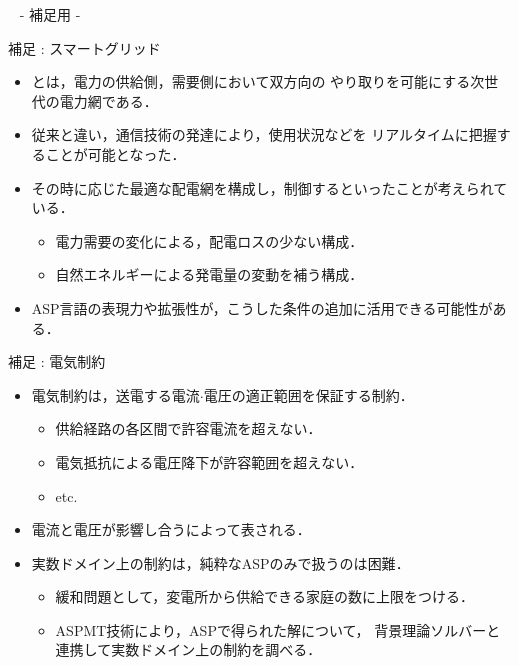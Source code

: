 \appendix
\backupbegin

\begin{frame}{~}
 \centering
 - 補足用 -
\end{frame} 

\begin{frame}{補足 : スマートグリッド}
 \begin{itemize}
  \item {}とは，電力の供給側，需要側において双方向の
		やり取りを可能にする次世代の電力網である．
  \item 従来と違い，通信技術の発達により，使用状況などを
		リアルタイムに把握することが可能となった．
  \item その時に応じた最適な配電網を構成し，制御するといったことが考えられている．
		\begin{itemize}
		 \item 電力需要の変化による，配電ロスの少ない構成．
		 \item 自然エネルギーによる発電量の変動を補う構成．
		\end{itemize}
  \item ASP言語の表現力や拡張性が，こうした条件の追加に活用できる可能性がある．
 \end{itemize}
\end{frame}

\begin{frame}{補足 : 電気制約}
 \begin{itemize}
  \item \alert{電気制約}は，送電する電流$\cdot$電圧の適正範囲を保証する制約．
  \begin{itemize}
   \item 供給経路の各区間で許容電流を超えない．
   \item 電気抵抗による電圧降下が許容範囲を超えない．
   \item etc.
  \end{itemize}
  \item 電流と電圧が影響し合うによって表される．
  \item 実数ドメイン上の制約は，純粋なASPのみで扱うのは\alert{困難}．
		\begin{itemize}
		 \item 緩和問題として，変電所から供給できる家庭の数に上限をつける．
		 \item ASPMT技術により，ASPで得られた解について，
			   背景理論ソルバーと連携して実数ドメイン上の制約を調べる．
		\end{itemize}
 \end{itemize}
\end{frame}


